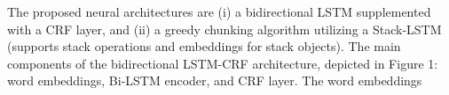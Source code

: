 \documentclass[11pt]{article}
\begin{document}
The proposed neural architectures are (i) a 
bidirectional LSTM supplemented with a CRF layer, and (ii)
a greedy chunking algorithm utilizing a Stack-LSTM 
(supports stack operations and embeddings for stack objects). 
The main components of the bidirectional LSTM-CRF architecture,
depicted in Figure 1: word embeddings, Bi-LSTM encoder, and CRF layer.
The word embeddings



\end{document}
